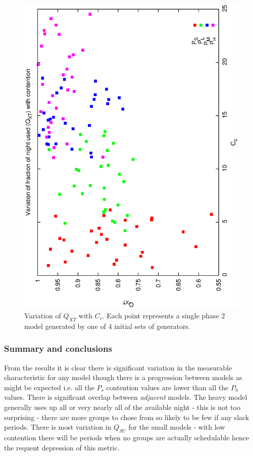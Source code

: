 \begin{figure}[h]

\begin{center}
 \includegraphics[scale=0.5, angle=-90]{figures/p2_gen_qxt.eps}
 \caption[Variation of $Q_{XT}$ with $C_C$ for variable phase2 generator models.] 
   {Variation of $Q_{XT}$ with $C_c$. Each point represents a single phase 2 model generated by one of 4 initial sets of generators.}
\label{fig:p2_gen_xt}
\end{center} 
\end{figure}


\subsubsection{Summary and conclusions}
From the results it is clear there is significant variation in the measurable characteristic for any model though there is a progression between models as might be expected i.e. all the $P_s$ contention values are lower than all the $P_h$ values. There is significant overlap between \emph{adjacent} models. The heavy model generally uses up all or very nearly all of the available night - this is not too surprising - there are more groups to chose from so likely to be few if any slack periods. There is most variation in $Q_{SU}$ for the small models - with low contention there will be periods when no groups are actually schedulable hence the requent depression of this metric.



